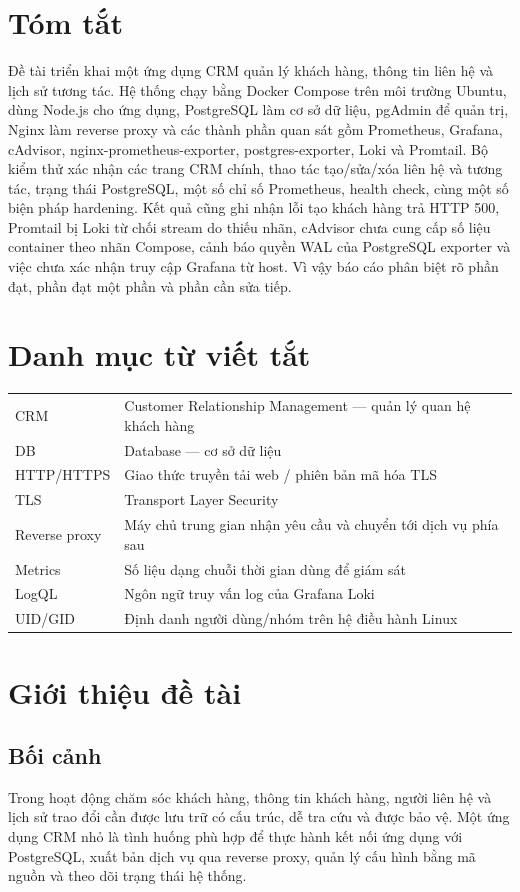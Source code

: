 \documentclass[12pt,a4paper]{report}
\begin{document}
\chapter*{Tóm tắt}
Đề tài triển khai một ứng dụng CRM quản lý khách hàng, thông tin liên hệ và lịch sử tương tác. Hệ thống chạy bằng Docker Compose trên môi trường Ubuntu, dùng Node.js cho ứng dụng, PostgreSQL làm cơ sở dữ liệu, pgAdmin để quản trị, Nginx làm reverse proxy và các thành phần quan sát gồm Prometheus, Grafana, cAdvisor, nginx-prometheus-exporter, postgres-exporter, Loki và Promtail. Bộ kiểm thử xác nhận các trang CRM chính, thao tác tạo/sửa/xóa liên hệ và tương tác, trạng thái PostgreSQL, một số chỉ số Prometheus, health check, cùng một số biện pháp hardening. Kết quả cũng ghi nhận lỗi tạo khách hàng trả HTTP 500, Promtail bị Loki từ chối stream do thiếu nhãn, cAdvisor chưa cung cấp số liệu container theo nhãn Compose, cảnh báo quyền WAL của PostgreSQL exporter và việc chưa xác nhận truy cập Grafana từ host. Vì vậy báo cáo phân biệt rõ phần đạt, phần đạt một phần và phần cần sửa tiếp.

\chapter*{Danh mục từ viết tắt}
\begin{longtable}{p{3cm}p{11cm}}
CRM & Customer Relationship Management — quản lý quan hệ khách hàng\\
DB & Database — cơ sở dữ liệu\\
HTTP/HTTPS & Giao thức truyền tải web / phiên bản mã hóa TLS\\
TLS & Transport Layer Security\\
Reverse proxy & Máy chủ trung gian nhận yêu cầu và chuyển tới dịch vụ phía sau\\
Metrics & Số liệu dạng chuỗi thời gian dùng để giám sát\\
LogQL & Ngôn ngữ truy vấn log của Grafana Loki\\
UID/GID & Định danh người dùng/nhóm trên hệ điều hành Linux\\
\end{longtable}
\tableofcontents
\clearpage
{}

\chapter{Giới thiệu đề tài}
\section{Bối cảnh}
Trong hoạt động chăm sóc khách hàng, thông tin khách hàng, người liên hệ và lịch sử trao đổi cần được lưu trữ có cấu trúc, dễ tra cứu và được bảo vệ. Một ứng dụng CRM nhỏ là tình huống phù hợp để thực hành kết nối ứng dụng với PostgreSQL, xuất bản dịch vụ qua reverse proxy, quản lý cấu hình bằng mã nguồn và theo dõi trạng thái hệ thống.
\end{document}
